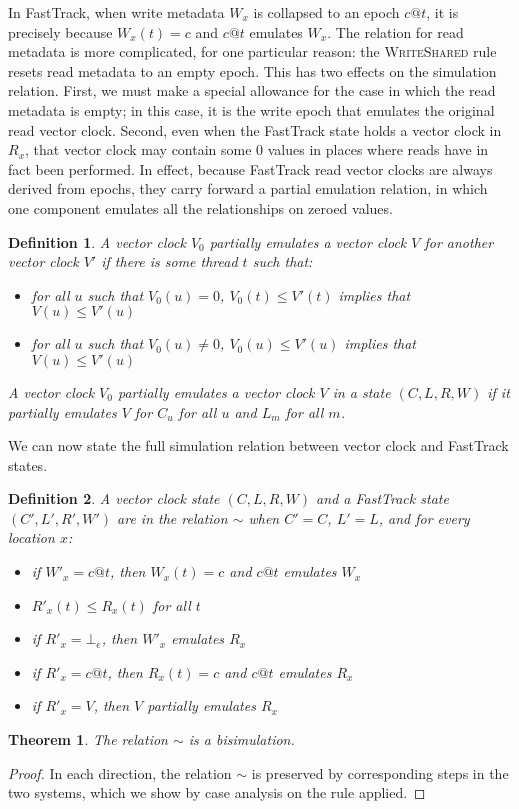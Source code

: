 \documentclass[preprint, 10pt]{sigplanconf}
\newcommand{\Rule}[1]{\textsc{#1}}
\newtheorem{theorem}{Theorem}
\newtheorem{definition}{Definition}
\begin{document}
In FastTrack, when write metadata $W_x$ is collapsed to an epoch $c@t$, it is precisely because $W_x(t) = c$ and $c@t$ emulates $W_x$. The relation for read metadata is more complicated, for one particular reason: the \Rule{WriteShared} rule resets read metadata to an empty epoch. This has two effects on the simulation relation. First, we must make a special allowance for the case in which the read metadata is empty; in this case, it is the write epoch that emulates the original read vector clock. Second, even when the FastTrack state holds a vector clock in $R_x$, that vector clock may contain some 0 values in places where reads have in fact been performed. In effect, because FastTrack read vector clocks are always derived from epochs, they carry forward a partial emulation relation, in which one component emulates all the relationships on zeroed values.
\begin{definition}A vector clock $V_0$ \emph{partially emulates} a vector clock $V$ for another vector clock $V'$ if there is some thread $t$ such that:

\begin{itemize}
\item for all $u$ such that $V_0(u) = 0$, $V_0(t) \le V'(t)$ implies that $V(u) \le V'(u)$
\item for all $u$ such that $V_0(u) \neq 0$, $V_0(u) \le V'(u)$ implies that $V(u) \le V'(u)$
\end{itemize}
A vector clock $V_0$ partially emulates a vector clock $V$ in a state $(C, L, R, W)$ if it partially emulates $V$ for $C_u$ for all $u$ and $L_m$ for all $m$.\end{definition}

We can now state the full simulation relation between vector clock and FastTrack states.
\begin{definition}A vector clock state $(C, L, R, W)$ and a FastTrack state $(C', L', R', W')$ are in the relation $\sim$ when $C' = C$, $L' = L$, and for every location $x$:
\begin{itemize}
\item if $W'_x = c@t$, then $W_x(t) = c$ and $c@t$ emulates $W_x$
\item $R'_x(t) \le R_x(t)$ for all $t$
\item if $R'_x = \bot_e$, then $W'_x$ emulates $R_x$
\item if $R'_x = c@t$, then $R_x(t) = c$ and $c@t$ emulates $R_x$
\item if $R'_x = V$, then $V$ partially emulates $R_x$
\end{itemize}
\end{definition}
\begin{theorem}The relation $\sim$ is a bisimulation.\end{theorem}
\begin{proof}In each direction, the relation $\sim$ is preserved by corresponding steps in the two systems, which we show by case analysis on the rule applied.\end{proof}
\end{document}
